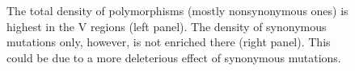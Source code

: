 \documentclass[12pt,a4paper,notitlepage,onecolumn]{article}
\begin{document}
\begin{figure}
\begin{center}
\caption{The total density of polymorphisms (mostly nonsynonymous ones) is
highest in the V regions (left panel). The density of synonymous mutations only,
however, is not enriched there (right panel). This could be due to a more
deleterious effect of synonymous mutations.}
\end{center}
\end{figure}
\end{document}
